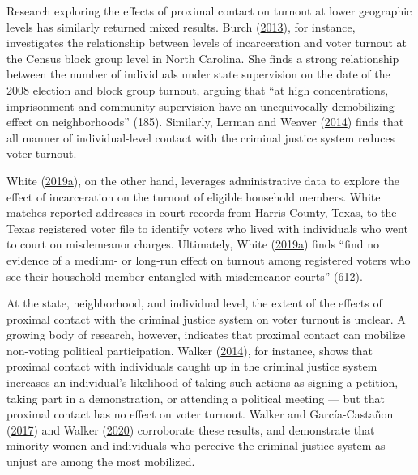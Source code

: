 \documentclass[
  12pt,
]{article}
\begin{document}
Research exploring the effects of proximal contact on turnout at lower geographic levels has similarly returned mixed results. Burch (\protect\hyperlink{ref-Burch2013}{2013}), for instance, investigates the relationship between levels of incarceration and voter turnout at the Census block group level in North Carolina. She finds a strong relationship between the number of individuals under state supervision on the date of the 2008 election and block group turnout, arguing that ``at high concentrations, imprisonment and community supervision have an unequivocally demobilizing effect on neighborhoods'' (185). Similarly, Lerman and Weaver (\protect\hyperlink{ref-Lerman2014}{2014}) finds that all manner of individual-level contact with the criminal justice system reduces voter turnout.

White (\protect\hyperlink{ref-White2019a}{2019}\protect\hyperlink{ref-White2019a}{a}), on the other hand, leverages administrative data to explore the effect of incarceration on the turnout of eligible household members. White matches reported addresses in court records from Harris County, Texas, to the Texas registered voter file to identify voters who lived with individuals who went to court on misdemeanor charges. Ultimately, White (\protect\hyperlink{ref-White2019a}{2019}\protect\hyperlink{ref-White2019a}{a}) finds ``find no evidence of a medium- or long-run effect on turnout among registered voters who see their household member entangled with misdemeanor courts'' (612).

At the state, neighborhood, and individual level, the extent of the effects of proximal contact with the criminal justice system on voter turnout is unclear. A growing body of research, however, indicates that proximal contact can mobilize non-voting political participation. Walker (\protect\hyperlink{ref-Walker2014}{2014}), for instance, shows that proximal contact with individuals caught up in the criminal justice system increases an individual's likelihood of taking such actions as signing a petition, taking part in a demonstration, or attending a political meeting --- but that proximal contact has no effect on voter turnout. Walker and García-Castañon (\protect\hyperlink{ref-Walker2017}{2017}) and Walker (\protect\hyperlink{ref-Walker2020}{2020}) corroborate these results, and demonstrate that minority women and individuals who perceive the criminal justice system as unjust are among the most mobilized.
\end{document}
